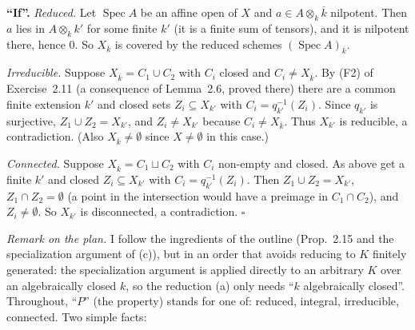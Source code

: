 \documentclass[11pt]{article}
\begin{document}
\textbf{``If''.} \emph{Reduced.} Let $\operatorname{Spec}A$ be an affine open of $X$ and $a\in A\otimes_k\overline k$ nilpotent. Then $a$ lies in $A\otimes_kk'$ for some finite $k'$ (it is a finite sum of tensors), and it is nilpotent there, hence $0$. So $X_{\overline k}$ is covered by the reduced schemes $(\operatorname{Spec}A)_{\overline k}$.

\emph{Irreducible.} Suppose $X_{\overline k}=C_1\cup C_2$ with $C_i$ closed and $C_i\neq X_{\overline k}$. By (F2) of Exercise~2.11 (a consequence of Lemma~2.6, proved there) there are a common finite extension $k'$ and closed sets $Z_i\subseteq X_{k'}$ with $C_i=q_{k'}^{-1}(Z_i)$. Since $q_{k'}$ is surjective, $Z_1\cup Z_2=X_{k'}$, and $Z_i\neq X_{k'}$ because $C_i\neq X_{\overline k}$. Thus $X_{k'}$ is reducible, a contradiction. (Also $X_{\overline k}\neq\emptyset$ since $X\neq\emptyset$ in this case.)

\emph{Connected.} Suppose $X_{\overline k}=C_1\sqcup C_2$ with $C_i$ non-empty and closed. As above get a finite $k'$ and closed $Z_i\subseteq X_{k'}$ with $C_i=q_{k'}^{-1}(Z_i)$. Then $Z_1\cup Z_2=X_{k'}$, $Z_1\cap Z_2=\emptyset$ (a point in the intersection would have a preimage in $C_1\cap C_2$), and $Z_i\neq\emptyset$. So $X_{k'}$ is disconnected, a contradiction. \hfill$\square$

\pf
\emph{Remark on the plan.} I follow the ingredients of the outline (Prop.~2.15 and the specialization argument of (c)), but in an order that avoids reducing to $K$ finitely generated: the specialization argument is applied directly to an arbitrary $K$ over an algebraically closed $k$, so the reduction (a) only needs ``$k$ algebraically closed''. Throughout, ``$P$'' (the property) stands for one of: reduced, integral, irreducible, connected. Two simple facts:
\end{document}
